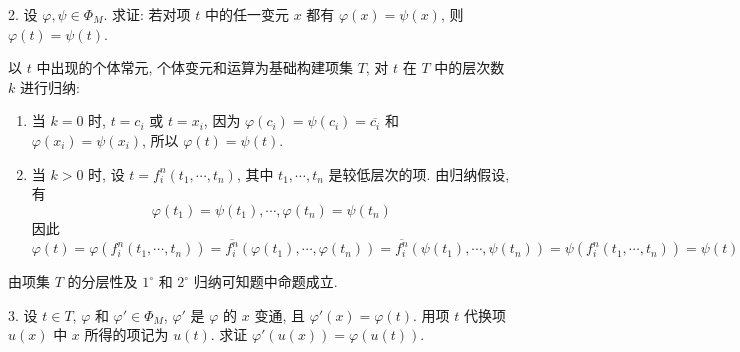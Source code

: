 \documentclass[boxes]{homework}
\begin{document}
\setlength\abovedisplayskip{.125em}
\setlength\belowdisplayskip{.125em}
\begin{problem}
2. 设 $\varphi, \psi \in \Phi_M$. 求证: 若对项 $t$ 中的任一变元 $x$ 都有 $\varphi(x)=\psi(x)$, 则 $\varphi(t)=\psi(t)$.
\end{problem}

\begin{solution}
    以 $t$ 中出现的个体常元, 个体变元和运算为基础构建项集 $T$, 对 $t$ 在 $T$ 中的层次数 $k$ 进行归纳:
    \begin{enumerate}[label = $\arabic*^\circ$, parsep = 0pt, itemsep = 0pt, topsep = .25em]
        \item 当 $k=0$ 时, $t=c_i$ 或 $t=x_i$, 因为 $\varphi(c_i)=\psi(c_i)=\overline{c_i}$ 和 $\varphi(x_i)=\psi(x_i)$, 所以 $\varphi(t)=\psi(t)$.
        \item 当 $k>0$ 时, 设 $t = f_i^n(t_1, \cdots, t_n)$, 其中 $t_1, \cdots, t_n$ 是较低层次的项. 由归纳假设, 有
              $$
                  \varphi(t_1) = \psi(t_1), \cdots, \varphi(t_n) = \psi(t_n)
              $$
              因此
              $$
                  \varphi(t) = \varphi(f_i^n(t_1, \cdots, t_n)) = \overline{f_i^n}(\varphi(t_1), \cdots, \varphi(t_n)) = \overline{f_i^n}(\psi(t_1), \cdots, \psi(t_n)) = \psi(f_i^n(t_1, \cdots, t_n)) = \psi(t)
              $$
    \end{enumerate}
    由项集 $T$ 的分层性及 $1^\circ$ 和 $2^\circ$ 归纳可知题中命题成立.
\end{solution}

\begin{problem}
3. 设 $t\in T$, $\varphi$ 和 $\varphi'\in \Phi_M$, $\varphi'$ 是 $\varphi$ 的 $x$ 变通, 且 $\varphi'(x)=\varphi(t)$. 用项 $t$ 代换项 $u(x)$ 中 $x$ 所得的项记为 $u(t)$. 求证 $\varphi'(u(x)) = \varphi(u(t))$.
\end{problem}
\end{document}
